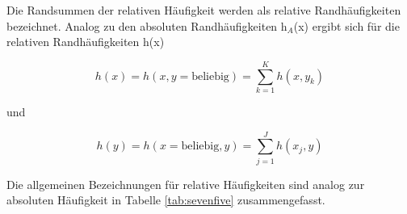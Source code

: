 \noindent Die Randsummen der relativen H\"{a}ufigkeit werden als relative Randh\"{a}ufigkeiten bezeichnet. Analog zu den absoluten Randh\"{a}ufigkeiten h$_{A}$(x) ergibt sich f\"{u}r die relativen Randh\"{a}ufigkeiten h(x) 

\begin{equation}\label{eq:sevenfive}
h(x)=h(x,y=\text{beliebig})=\sum _{k=1}^{K}h(x,y_{k})
\end{equation}

\noindent und

\begin{equation}\label{eq:sevensix}
h(y)=h(x=\text{beliebig},y)=\sum _{j=1}^{J}h(x_{j} ,y)
\end{equation}

\noindent Die allgemeinen Bezeichnungen f\"{u}r relative H\"{a}ufigkeiten sind analog zur absoluten H\"{a}ufigkeit in Tabelle \ref{tab:sevenfive} zusammengefasst.

\clearpage

